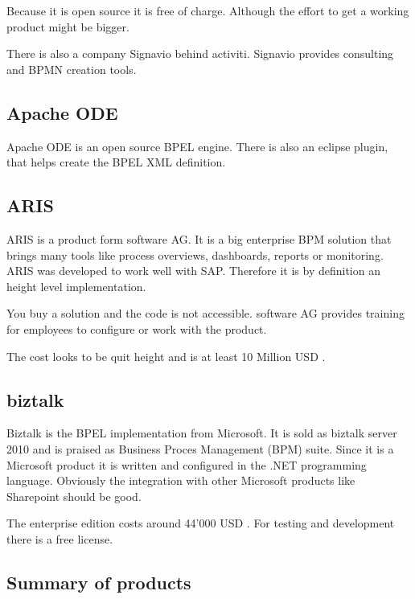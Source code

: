 \documentclass[paper=a4,twoside=false,BCOR=0mm,DIV=calc,fontsize=12pt]{scrartcl}
\begin{document}
Because it is open source it is free of charge. Although the effort to get a working product might be bigger. 

There is also a company Signavio \cite{signavio} behind activiti. Signavio provides consulting and BPMN creation tools.

\subsection{Apache ODE}
Apache ODE \cite{appacheODE} is an open source BPEL engine. There is also an eclipse plugin, that helps create the BPEL XML definition.



\subsection{ARIS}
ARIS \cite{aris} is a product form software AG. It is a big enterprise BPM solution that brings many tools like process overviews, dashboards, reports or monitoring. ARIS was developed to work well with SAP. Therefore it is by definition an height level implementation.

You buy a solution and the code is not accessible. software AG provides training for employees to configure or work with the product. 

The cost looks to be quit height and is at least 10 Million USD \cite{ariscost}.



\subsection{biztalk}
Biztalk \cite{biztalk} is the BPEL implementation from Microsoft. It is sold as biztalk server 2010 and is praised as Business Proces Management (BPM) suite. Since it is a Microsoft product it is written and configured in the .NET programming language. Obviously the integration with other Microsoft products like Sharepoint should be good.

The enterprise edition costs around 44'000 USD \cite{biztalkcost}. For testing and development there is a free license.


\subsection{Summary of products}
\end{document}
